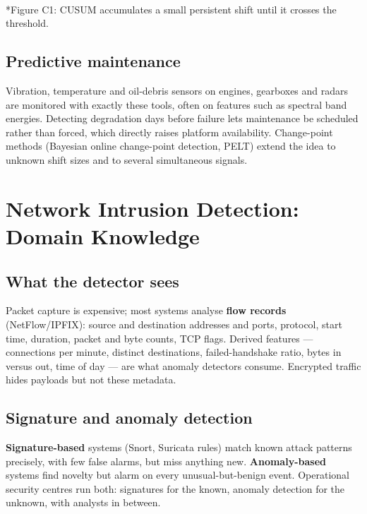 \documentclass[11pt]{article}
\begin{document}
\begin{center}\\*{\small\color{GreyN}Figure C1: CUSUM accumulates a small persistent shift until it crosses the threshold.}\end{center}
\subsection{Predictive maintenance}
Vibration, temperature and oil-debris sensors on engines, gearboxes and radars are monitored with exactly these tools, often on features such as spectral band energies. Detecting degradation days before failure lets maintenance be scheduled rather than forced, which directly raises platform availability. Change-point methods (Bayesian online change-point detection, PELT) extend the idea to unknown shift sizes and to several simultaneous signals.

\section{Network Intrusion Detection: Domain Knowledge}
\subsection{What the detector sees}
Packet capture is expensive; most systems analyse \textbf{flow records} (NetFlow/IPFIX): source and destination addresses and ports, protocol, start time, duration, packet and byte counts, TCP flags. Derived features --- connections per minute, distinct destinations, failed-handshake ratio, bytes in versus out, time of day --- are what anomaly detectors consume. Encrypted traffic hides payloads but not these metadata.
\subsection{Signature and anomaly detection}
\textbf{Signature-based} systems (Snort, Suricata rules) match known attack patterns precisely, with few false alarms, but miss anything new. \textbf{Anomaly-based} systems find novelty but alarm on every unusual-but-benign event. Operational security centres run both: signatures for the known, anomaly detection for the unknown, with analysts in between.
\end{document}
